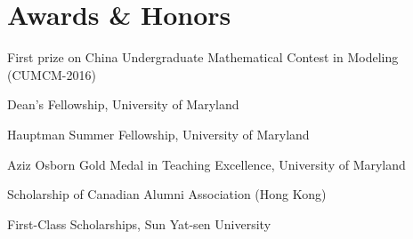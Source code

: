 \section{Awards \& Honors}

\begin{customItem}

\item First prize on China Undergraduate Mathematical Contest in Modeling (CUMCM-2016)
\item Dean’s Fellowship, University of Maryland
\item Hauptman Summer Fellowship, University of Maryland
\item Aziz Osborn Gold Medal in Teaching Excellence, University of Maryland
\item Scholarship of Canadian Alumni Association (Hong Kong)
\item First-Class Scholarships, Sun Yat-sen University
\end{customItem}